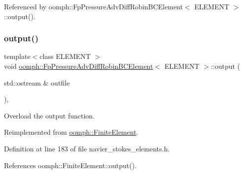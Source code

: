 Referenced by oomph\+::\+Fp\+Pressure\+Adv\+Diff\+Robin\+B\+C\+Element$<$ E\+L\+E\+M\+E\+N\+T $>$\+::output().

\mbox{\label{classoomph_1_1FpPressureAdvDiffRobinBCElement_a64be3ee4d96836005509bc7b5ce7f098}} 
\subsubsection{\texorpdfstring{output()}{output()}\hspace{0.1cm}{\footnotesize\ttfamily [1/2]}}
{\footnotesize\ttfamily template$<$class E\+L\+E\+M\+E\+NT $>$ \\
void \hyperlink{classoomph_1_1FpPressureAdvDiffRobinBCElement}{oomph\+::\+Fp\+Pressure\+Adv\+Diff\+Robin\+B\+C\+Element}$<$ E\+L\+E\+M\+E\+NT $>$\+::output (\begin{DoxyParamCaption}\item[{std\+::ostream \&}]{outfile }\end{DoxyParamCaption})\hspace{0.3cm}{\ttfamily [inline]}, {\ttfamily [virtual]}}



Overload the output function. 



Reimplemented from \hyperlink{classoomph_1_1FiniteElement_a2ad98a3d2ef4999f1bef62c0ff13f2a7}{oomph\+::\+Finite\+Element}.



Definition at line 183 of file navier\+\_\+stokes\+\_\+elements.\+h.



References oomph\+::\+Finite\+Element\+::output().

\mbox{\label{classoomph_1_1FpPressureAdvDiffRobinBCElement_ab4045d7aced2c411f2c3026037674f54}} 
